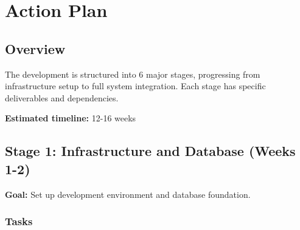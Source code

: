 \documentclass[12pt,a4paper]{article}
\begin{document}
\newpage

\section{Action Plan}

\subsection{Overview}

The development is structured into 6 major stages, progressing from infrastructure setup to full system integration. Each stage has specific deliverables and dependencies.

\textbf{Estimated timeline:} 12-16 weeks

\subsection{Stage 1: Infrastructure and Database (Weeks 1-2)}

\textbf{Goal:} Set up development environment and database foundation.

\subsubsection{Tasks}
\end{document}
